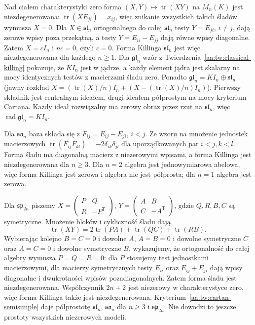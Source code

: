 \newpage
\begin{przyklad}
\label{aa:prz:killing-classical-consequences}
Nad ciałem charakterystyki zero forma
$(X,Y)\mapsto\operatorname{tr}(XY)$ na $M_n(K)$
jest niezdegenerowana: $\operatorname{tr}(XE_{ji})=x_{ij}$,
więc znikanie wszystkich takich śladów wymusza $X=0$.
Dla $X\in\mathfrak{sl}_n$ ortogonalnego do całej
$\mathfrak{sl}_n$ testy $Y=E_{ji}$, $i\ne j$,
dają zerowe wpisy poza przekątną, a testy
$Y=E_{ii}-E_{jj}$ dają równe wpisy diagonalne.
Zatem $X=cI_n$ i $nc=0$, czyli $c=0$.
Forma Killinga $\mathfrak{sl}_n$ jest więc
niezdegenerowana dla każdego $n\ge1$.
Dla $\mathfrak{gl}_n$ wzór z
Twierdzenia~\ref{aa:tw:classical-killing}
pokazuje, że $KI_n$ jest w jądrze, a każdy
element jądra jest skalarny na mocy identycznych
testów z macierzami śladu zero. Ponadto
$\mathfrak{gl}_n=KI_n\oplus\mathfrak{sl}_n$
(jawny rozkład $X=(\operatorname{tr}(X)/n)I_n+
(X-(\operatorname{tr}(X)/n)I_n)$). Pierwszy
składnik jest centralnym ideałem, drugi ideałem
półprostym na mocy kryterium Cartana.
Każdy ideał rozwiązalny ma zerowy obraz przez
rzut na $\mathfrak{sl}_n$, więc
$\operatorname{rad}\mathfrak{gl}_n=KI_n$.

Dla $\mathfrak{so}_n$ baza składa się z
$F_{ij}=E_{ij}-E_{ji}$, $i<j$. Ze wzoru
na mnożenie jednostek macierzowych
$\operatorname{tr}(F_{ij}F_{kl})=-2\delta_{ik}\delta_{jl}$
dla uporządkowanych par $i<j,k<l$. Forma śladu
ma diagonalną macierz z niezerowymi wpisami,
a forma Killinga jest niezdegenerowana dla $n\ge3$.
Dla $n=2$ algebra jest jednowymiarowa abelowa,
więc forma Killinga jest zerowa i algebra nie
jest półprosta; dla $n=1$ algebra jest zerowa.

Dla $\mathfrak{sp}_{2n}$ piszemy
$X=\begin{pmatrix}P&Q\\R&-P^{\mathsf T}\end{pmatrix}$,
$Y=\begin{pmatrix}A&B\\C&-A^{\mathsf T}\end{pmatrix}$,
gdzie $Q,R,B,C$ są symetryczne. Mnożenie bloków
i cykliczność śladu dają
\[
 \operatorname{tr}(XY)=2\operatorname{tr}(PA)
                    +\operatorname{tr}(QC)
                    +\operatorname{tr}(RB).
\]
Wybierając kolejno $B=C=0$ i dowolne $A$,
$A=B=0$ i dowolne symetryczne $C$ oraz $A=C=0$
i dowolne symetryczne $B$, wykazujemy, że
ortogonalność do całej algebry wymusza $P=Q=R=0$:
dla $P$ stosujemy test jednostkami macierzowymi,
dla macierzy symetrycznych testy $E_{ii}$
oraz $E_{ij}+E_{ji}$ dają wpisy diagonalne
i dwukrotności wpisów pozadiagonalnych.
Zatem forma śladu jest niezdegenerowana.
Współczynnik $2n+2$ jest niezerowy w charakterystyce
zero, więc forma Killinga także jest niezdegenerowana.
Kryterium~\ref{aa:tw:cartan-semisimple} daje
półprostotę $\mathfrak{sl}_n$, $\mathfrak{so}_n$
dla $n\ge3$ i $\mathfrak{sp}_{2n}$.
Nie dowodzi to jeszcze prostoty wszystkich
niezerowych modeli.
\end{przyklad}

